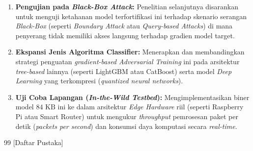 \documentclass[11pt, a4paper]{article}
\begin{document}
\begin{enumerate}
    \item \textbf{Pengujian pada \textit{Black-Box Attack}:} Penelitian selanjutnya disarankan untuk menguji ketahanan model terfortifikasi ini terhadap skenario serangan \textit{Black-Box} (seperti \textit{Boundary Attack} atau \textit{Query-based Attacks}) di mana penyerang tidak memiliki akses langsung terhadap gradien model target.
    
    \item \textbf{Ekspansi Jenis Algoritma Classifier:} Menerapkan dan membandingkan strategi penguatan \textit{gradient-based Adversarial Training} ini pada arsitektur \textit{tree-based} lainnya (seperti LightGBM atau CatBoost) serta model \textit{Deep Learning} yang terkompresi (\textit{quantized neural networks}).

    \item \textbf{Uji Coba Lapangan (\textit{In-the-Wild Testbed}):} Mengimplementasikan biner model $84\text{ KB}$ ini ke dalam arsitektur \textit{Edge Hardware} riil (seperti Raspberry Pi atau Smart Router) untuk mengukur \textit{throughput} pemrosesan paket per detik (\textit{packets per second}) dan konsumsi daya komputasi secara \textit{real-time}.
\end{enumerate}


\begin{thebibliography}{99}
[Daftar Pustaka]
\end{thebibliography}
\end{document}
